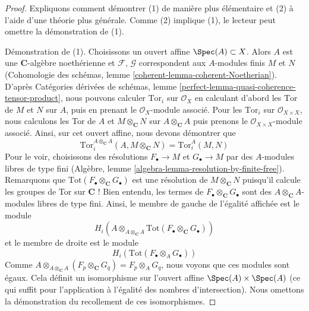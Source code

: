 \begin{proof}
Expliquons comment démontrer (1) de manière plus élémentaire et (2) à l'aide
d'une théorie plus générale. Comme (2) implique (1), le lecteur peut omettre la démonstration
de (1).

\medskip\noindent
Démonstration de (1). Choisissons un ouvert affine $\Spec(A) \subset X$.
Alors $A$ est une $\mathbf{C}$-algèbre noethérienne et
$\mathcal{F}$, $\mathcal{G}$ correspondent aux $A$-modules finis
$M$ et $N$ (Cohomologie des schémas, lemme
\ref{coherent-lemma-coherent-Noetherian}).
D'après Catégories dérivées de schémas, lemme
\ref{perfect-lemma-quasi-coherence-tensor-product}, nous pouvons
calculer $\text{Tor}_i$ sur $\mathcal{O}_X$
en calculant d'abord les $\text{Tor}$
de $M$ et $N$ sur $A$, puis en prenant le $\mathcal{O}_X$-module associé.
Pour les $\text{Tor}_i$ sur $\mathcal{O}_{X \times X}$, nous calculons
les Tor de $A$ et $M \otimes_\mathbf{C} N$ sur $A \otimes_\mathbf{C} A$
puis prenons le $\mathcal{O}_{X \times X}$-module associé.
Ainsi, sur cet ouvert affine, nous devons démontrer que
$$
\text{Tor}_i^{A \otimes_\mathbf{C} A}(A, M \otimes_\mathbf{C} N) =
\text{Tor}_i^A(M, N)
$$
Pour le voir, choisissons des résolutions $F_\bullet \to M$ et $G_\bullet \to M$
par des $A$-modules libres de type fini
(Algèbre, lemme \ref{algebra-lemma-resolution-by-finite-free}).
Remarquons que $\text{Tot}(F_\bullet \otimes_\mathbf{C} G_\bullet)$
est une résolution de $M \otimes_\mathbf{C} N$ puisqu'il calcule les
groupes de Tor sur $\mathbf{C}$ ! Bien entendu, les termes de
$F_\bullet \otimes_\mathbf{C} G_\bullet$ sont des
$A \otimes_\mathbf{C} A$-modules libres de type fini. Ainsi, le membre de gauche
de l'égalité affichée est le module
$$
H_i(A \otimes_{A \otimes_\mathbf{C} A}
\text{Tot}(F_\bullet \otimes_\mathbf{C} G_\bullet))
$$
et le membre de droite est le module
$$
H_i(\text{Tot}(F_\bullet \otimes_A G_\bullet))
$$
Comme $A \otimes_{A \otimes_\mathbf{C} A} (F_p \otimes_\mathbf{C} G_q)
= F_p \otimes_A G_q$, nous voyons que ces modules sont égaux.
Cela définit un isomorphisme sur l'ouvert affine $\Spec(A) \times \Spec(A)$
(ce qui suffit pour l'application à l'égalité des nombres d'intersection).
Nous omettons la démonstration du recollement de ces isomorphismes.


\end{proof}
